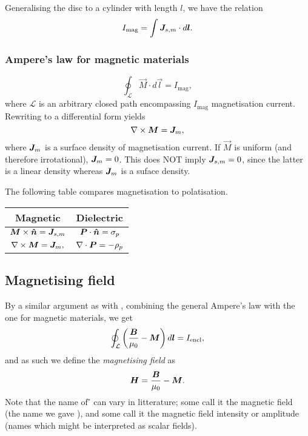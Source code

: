         Generalising the disc to a cylinder with length $l$, we have the relation
        \begin{equation}
            I_{\text{mag}} = \int \bm{J}_{s, m}\cdot d\bm{l}.
        \end{equation}

    \subsubsection{Ampere's law for magnetic materials}
        \begin{equation}
            \oint_\mathcal{L}\vec{M}\cdot d\vec{l} = I_{\text{mag}},
        \end{equation}
        where $\mathcal{L}$ is an arbitrary closed path encompassing $I_{\text{mag}}$ magnetisation current. 
        Rewriting to a differential form yields
        \begin{equation}
            \nabla \times \bm{M} = \bm{J}_m,
        \end{equation}
        where $\bm{J}_m$ is a surface density of magnetisation current. 
        If $\vec{M}$ is uniform (and therefore irrotational), $\bm{J}_m = 0$. 
        This does NOT imply $\bm{J}_{s, m} = 0$, since the latter is a linear density whereas $\bm{J}_m$ is a suface density.

        The following table compares magnetisation to polatisation.
        \begin{center}
            \begin{tabular}{ c|c } 
            Magnetic & Dielectric \\
            \hline
                $\vec{M}\times\hat{n} = \j_{s, m}$ & $\p \cdot \hat{n} = \sigma_p$ \\
                $\nabla \times \bm{M} = \bm{J}_m,$ & $\nabla \cdot \bm{P} = -\rho_p$
            \end{tabular}
        \end{center}

\subsection{Magnetising field}
    By a similar argument as with \D, combining the general Ampere's law with the one for magnetic materials, we get
    \begin{equation*}
        \oint_\mathcal{L}\left(\frac{\bm{B}}{\mu_0}-\bm{M}\right)d\bm{l} = I_{\text{encl}},
    \end{equation*}
    and as such we define the \textit{magnetising field} as 
    \begin{equation}
        \bm{H} = \frac{\bm{B}}{\mu_0}-\bm{M}.
    \end{equation}
    Note that the name of \H{} can vary in litterature; some call it the magnetic field 
    (the name we gave \B), and some call it the magnetic field intensity or amplitude 
    (names which might be interpreted as scalar fields).

